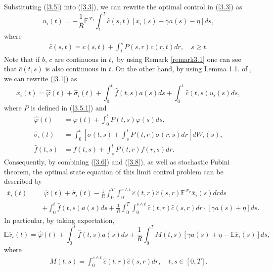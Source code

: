 \documentclass[11pt]{article}
\def\dbE{\mathbb{E}}
\begin{document}
Substituting (\ref{3.5}) into (\ref{3.3}), we can rewrite the
optimal control in (\ref{3.3}) as
%
\begin{equation}\label{3.6}
\overline{u}_{i}(t)=-\frac{1}{R}\dbE^{\mathcal{F}_{t}}\!\!\int_{t}^{T}\widehat{c}(s,t)[\overline{x}_{i}(s)-\gamma a(s)-\eta ]ds,
\end{equation}%
%
where
%
\begin{eqnarray}\label{3.7}
\widehat{c}(s,t)=c(s,t)+\int_{t}^{s}P(s,r)c(r,t)dr,\quad s\geq t.
\end{eqnarray}
%
Note that if $b$, $c$ are continuous in $t,$ by using Remark \ref{remark3.1} one can see that $\widehat{c}%
(t,s)$ is also continuous in $t.$ On the other hand, by using Lemma
1.1. of \cite{Y 1996}, we can rewrite (\ref{3.1}) as%
%
\begin{equation}\label{3.8}
x_{i}(t)=\widehat{\varphi }(t)+\widehat{\sigma }_i(t)+\int_0^t\widehat{f}(t,s)a(s)ds+\int_{0}^{t}\widehat{c}(t,s)u_{i}(s)ds,
\end{equation}%
%
where $P$ is defined in (\ref{3.5.1}) and
%
\begin{align}\label{3.8.1}
\widehat{\varphi }(t) &=\varphi (t)+\int_{0}^{t}P(t,s)\varphi(s)ds, \nonumber\\
\widehat{\sigma }_{i}(t) &=\int_{0}^{t}\left[\sigma(t,s)+\int_{s}^{t}P(t,r)\sigma(r,s)dr\right] dW_{i}(s),\nonumber\\
\widehat{f}(t,s)&=f(t,s)+\int_{s}^{t}P(t,r)f(r,s)dr.
\end{align}%
%
Consequently, by combining (\ref{3.6}) and (\ref{3.8}), as well as
stochastic Fubini theorem, the optimal state equation of this limit
control problem can be described by
%
\begin{align}\label{3.9}
\overline{x}_{i}(t) = & \; \widehat{\varphi }(t)+\widehat{\sigma}_i
(t)-\frac{1}{R}\int_{0}^{T}\int_{0}^{s\wedge t}\widehat{c}(t,r)\widehat{c}%
(s,r)\dbE^{\mathcal{F}_{r}}\overline{x}_{i}(s)drds  \nonumber\\
& + \int_0^t\widehat{f}(t,s)a(s)ds+\frac{1}{R}\int_{0}^{T}\int_{0}^{s\wedge t}
\widehat{c}(t,r)\widehat{c}(s,r)dr\cdot[\gamma a(s)+\eta ]ds.
\end{align}%
%
In particular, by taking expectation,
%
\begin{equation}\label{3.10}
\dbE\overline{x}_{i}(t)=\widehat{\varphi }(t)+\int_0^t\widehat{f}(t,s)a(s)ds+\frac{1}{R}
\int_{0}^{T}M(t,s)[\gamma a(s)+\eta-\dbE\overline{x}_{i}(s)]ds,
\end{equation}%
%
where
%
\begin{eqnarray}\label{3.11}
M(t,s)=\int_{0}^{s\wedge t}\widehat{c}(t,r)\widehat{c}(s,r)dr,\quad
t,s\in[0,T].
\end{eqnarray}
\end{document}
